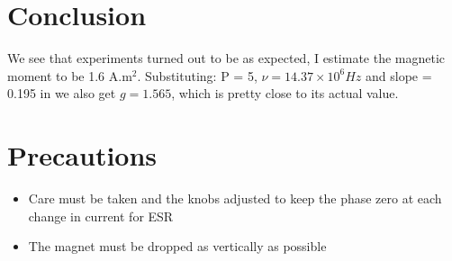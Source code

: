\documentclass{double}
\begin{document}
\section{Conclusion}

We see that experiments turned out to be as expected, I estimate the magnetic moment to be 1.6 A.m\(^2\). Substituting: P = 5, \(\nu = 14.37 \times 10^6 Hz\) and slope = 0.195 in we also get \(g = 1.565\), which is pretty close to its actual value.

\section{Precautions}

\begin{itemize}
\tightlist
\item
  Care must be taken and the knobs adjusted to keep the phase zero at each change in current for ESR
\item
  The magnet must be dropped as vertically as possible
\end{itemize}
\end{document}
